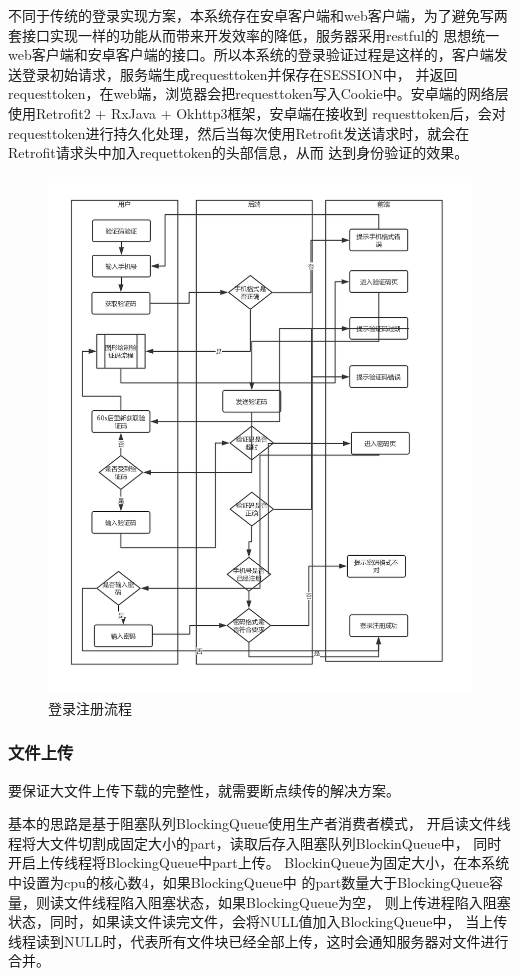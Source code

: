 不同于传统的登录实现方案，本系统存在安卓客户端和web客户端，为了避免写两套接口实现一样的功能从而带来开发效率的降低，服务器采用restful的
思想统一web客户端和安卓客户端的接口。所以本系统的登录验证过程是这样的，客户端发送登录初始请求，服务端生成requesttoken并保存在SESSION中，
并返回requesttoken，在web端，浏览器会把requesttoken写入Cookie中。安卓端的网络层使用Retrofit2 + RxJava + Okhttp3框架，安卓端在接收到
requesttoken后，会对requesttoken进行持久化处理，然后当每次使用Retrofit发送请求时，就会在Retrofit请求头中加入requettoken的头部信息，从而
达到身份验证的效果。
\begin{figure}[H]
  \centering
  \includegraphics[width=130mm]{./figures/login_liucheng.png}
  \caption{登录注册流程}
\end{figure}

\subsubsection{文件上传}
要保证大文件上传下载的完整性，就需要断点续传的解决方案。

基本的思路是基于阻塞队列BlockingQueue使用生产者消费者模式，
开启读文件线程将大文件切割成固定大小的part，读取后存入阻塞队列BlockinQueue中，
同时开启上传线程将BlockingQueue中part上传。
BlockinQueue为固定大小，在本系统中设置为cpu的核心数4，如果BlockingQueue中
的part数量大于BlockingQueue容量，则读文件线程陷入阻塞状态，如果BlockingQueue为空，
则上传进程陷入阻塞状态，同时，如果读文件读完文件，会将NULL值加入BlockingQueue中，
当上传线程读到NULL时，代表所有文件块已经全部上传，这时会通知服务器对文件进行合并\cite{r30}。


